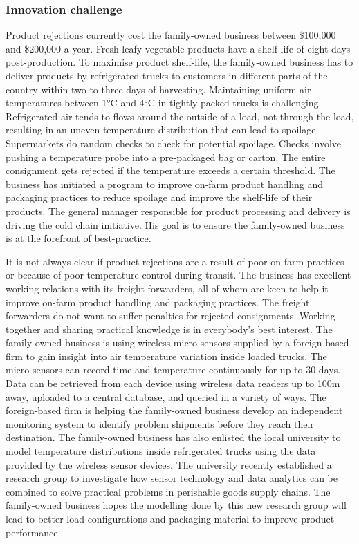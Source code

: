 \subsubsection{Innovation challenge}

Product rejections currently cost the family-owned business between \$100,000 and \$200,000 a year. Fresh leafy vegetable products have a shelf-life of eight days post-production. To maximise product shelf-life, the family-owned business has to deliver products by refrigerated trucks to customers in different parts of the country within two to three days of harvesting. Maintaining uniform air temperatures between 1\si{\degree}C and 4\si{\degree}C in tightly-packed trucks is challenging. Refrigerated air tends to flows around the outside of a load, not through the load, resulting in an uneven temperature distribution that can lead to spoilage. Supermarkets do random checks to check for potential spoilage. Checks involve pushing a temperature probe into a pre-packaged bag or carton. The entire consignment gets rejected if the temperature exceeds a certain threshold. The business has initiated a program to improve on-farm product handling and packaging practices to reduce spoilage and improve the shelf-life of their products. The general manager responsible for product processing and delivery is driving the cold chain initiative. His goal is to ensure the family-owned business is at the forefront of best-practice. \medskip

It is not always clear if product rejections are a result of poor on-farm practices or because of poor temperature control during transit. The business has excellent working relations with its freight forwarders, all of whom are keen to help it improve on-farm product handling and packaging practices. The freight forwarders do not want to suffer penalties for rejected consignments. Working together and sharing practical knowledge is in everybody's best interest. The family-owned business is using wireless micro-sensors supplied by a foreign-based firm to gain insight into air temperature variation inside loaded trucks. The micro-sensors can record time and temperature continuously for up to 30 days. Data can be retrieved from each device using wireless data readers up to 100m away, uploaded to a central database, and queried in a variety of ways. The foreign-based firm is helping the family-owned business develop an independent monitoring system to identify problem shipments before they reach their destination. The family-owned business has also enlisted the local university to model temperature distributions inside refrigerated trucks using the data provided by the wireless sensor devices. The university recently established a research group to investigate how sensor technology and data analytics can be combined to solve practical problems in perishable goods supply chains. The family-owned business hopes the modelling done by this new research group will lead to better load configurations and packaging material to improve product performance. \medskip

